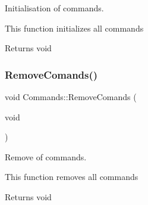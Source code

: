 Initialisation of commands. 

This function initializes all commands

\begin{DoxyReturn}{Returns}
void 
\end{DoxyReturn}
\mbox{\label{namespace_commands_ae6511be8bafb608ff2b1861a98e3e4e6}} 
\subsubsection{\texorpdfstring{Remove\+Comands()}{RemoveComands()}}
{\footnotesize\ttfamily void Commands\+::\+Remove\+Comands (\begin{DoxyParamCaption}\item[{void}]{ }\end{DoxyParamCaption})}



Remove of commands. 

This function removes all commands

\begin{DoxyReturn}{Returns}
void 
\end{DoxyReturn}
